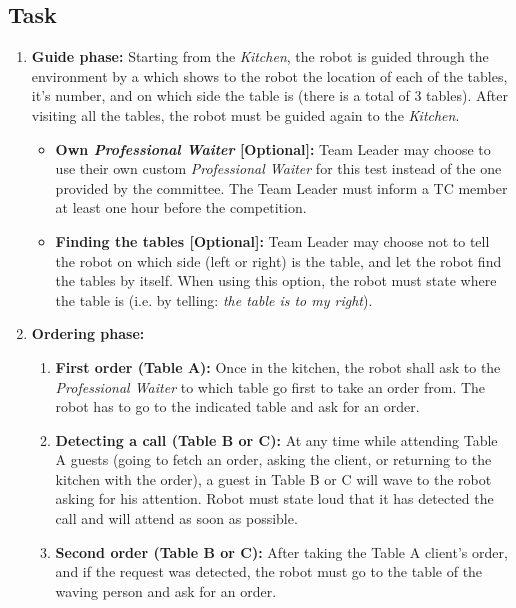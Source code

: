 \subsection{Task}
\begin{enumerate}

\item \textbf{Guide phase:} Starting from the \textit{Kitchen}, the robot is guided through the environment by a  which shows to the robot the location of each of the tables, it's number, and on which side the table is (there is a total of 3 tables). After visiting all the tables, the robot must be guided again to the \textit{Kitchen}.
\begin{itemize}
\item \textbf{Own \textit{Professional Waiter} [Optional]:} Team Leader may choose to use their own custom \textit{Professional Waiter} for this test instead of the one provided by the committee. The Team Leader must inform a TC member at least one hour before the competition.
\item \textbf{Finding the tables [Optional]:} Team Leader may choose not to tell the robot on which side (left or right) is the table, and let the robot find the tables by itself. When using this option, the robot must state where the table is (i.e. by telling: \textit{the table is to my right}).
\end{itemize}

\item \textbf{Ordering phase:}
\begin{enumerate}
\item \textbf{First order (Table A):} Once in the kitchen, the robot shall ask to the \textit{Professional Waiter} to which table go first to take an order from. The robot has to go to the indicated table and ask for an order.

\item \textbf{Detecting a call (Table B or C):} At any time while attending Table A guests (going to fetch an order, asking the client, or returning to the kitchen with the order), a guest in Table B or C will wave to the robot asking for his attention. Robot must state loud that it has detected the call and will attend as soon as possible.

\item \textbf{Second order (Table B or C):} After taking the Table A client's order, and if the request was detected, the robot must go to the table of the waving person and ask for an order.


\end{enumerate}
\end{enumerate}
